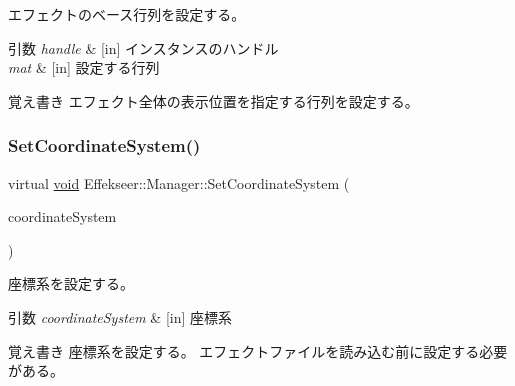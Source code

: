 エフェクトのベース行列を設定する。 


\begin{DoxyParams}{引数}
{\em handle} & \mbox{[}in\mbox{]} インスタンスのハンドル \\
\hline
{\em mat} & \mbox{[}in\mbox{]} 設定する行列 \\
\hline
\end{DoxyParams}
\begin{DoxyNote}{覚え書き}
エフェクト全体の表示位置を指定する行列を設定する。 
\end{DoxyNote}
\mbox{\label{class_effekseer_1_1_manager_a804730036eada2d3e1883ed366c265cc}} 
\subsubsection{\texorpdfstring{Set\+Coordinate\+System()}{SetCoordinateSystem()}}
{\footnotesize\ttfamily virtual \mbox{\hyperlink{namespace_effekseer_ab34c4088e512200cf4c2716f168deb56}{void}} Effekseer\+::\+Manager\+::\+Set\+Coordinate\+System (\begin{DoxyParamCaption}\item[{\mbox{\hyperlink{namespace_effekseer_ac8508f8823c5fcf36aac5d2ddee23765}{Coordinate\+System}}}]{coordinate\+System }\end{DoxyParamCaption})\hspace{0.3cm}{\ttfamily [pure virtual]}}



座標系を設定する。 


\begin{DoxyParams}{引数}
{\em coordinate\+System} & \mbox{[}in\mbox{]} 座標系 \\
\hline
\end{DoxyParams}
\begin{DoxyNote}{覚え書き}
座標系を設定する。 エフェクトファイルを読み込む前に設定する必要がある。 
\end{DoxyNote}
\mbox{\label{class_effekseer_1_1_manager_a1e183d9310c8562279707786e5503f8f}} 

